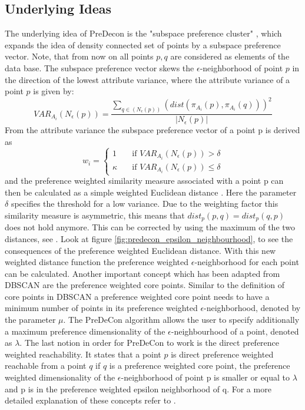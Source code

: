 \documentclass[a4paper]{article}
\begin{document}
\subsection{Underlying Ideas}
The underlying idea of PreDecon is the "subspace preference cluster" \cite{bohm2004density}, which expands the idea of density connected set of points by a subspace preference vector. Note, that from now on all points $p,q$ are considered as elements of the data base. The subspace preference vector skews the  $\epsilon$-neighborhood of point $p$ in the direction of the lowest attribute variance, where the attribute variance of a point $p$ is given by: 
$$VAR_{A_i}(N_{\epsilon}(p))=\frac {\sum_{q \in (N_{\epsilon}(p))} (dist(\pi_{A_i}(p),\pi_{A_i}(q)))^2} {|N_{\epsilon}(p)|}$$
From the attribute variance the subspace preference vector of a point p is derived as
\[ w_i =
  \begin{cases}
    1       & \quad \text{if } VAR_{A_i}(N_{\epsilon}(p))  > \delta \\
    \kappa  & \quad \text{if } VAR_{A_i}(N_{\epsilon}(p))  \leq \delta
  \end{cases}
\]
and the preference weighted similarity measure associated with a point p can then be calculated as a simple weighted Euclidean distance \cite{bohm2004density}. Here the parameter $\delta$ specifies the threshold for a low variance. Due to the weighting factor this similarity measure is asymmetric, this means that $dist_{p}(p,q) = dist_{p}(q,p)$ does not hold anymore. This can be corrected by using the maximum of the two distances, see \cite{bohm2004density}. Look at figure \ref{fig:predecon_epsilon_neighbourhood}, to see the consequences of the preference weighted Euclidean distance. With this new weighted distance function the preference weighted $\epsilon$-neighborhood for each point can be calculated. Another important concept which has been adapted from DBSCAN are the preference weighted core points. Similar to the definition of core points in DBSCAN a preference weighted core point needs to have a minimum number of points in its preference weighted $\epsilon$-neighborhood, denoted by the parameter $\mu$. The PreDeCon algorithm allows the user to specify additionally a maximum preference dimensionality of the $\epsilon$-neighbourhood of a point, denoted as $\lambda$. The last notion in order for PreDeCon to work is the direct preference weighted reachability. It states that a point $p$ is direct preference weighted reachable from a point $q$ if $q$ is a preference weighted core point, the preference weighted dimensionality of the $\epsilon$-neighborhood of point p is smaller or equal to $\lambda$ and p is in the preference weighted epsilon neighborhood of q. For a more detailed explanation of these concepts refer to \cite{bohm2004density}.
\end{document}
